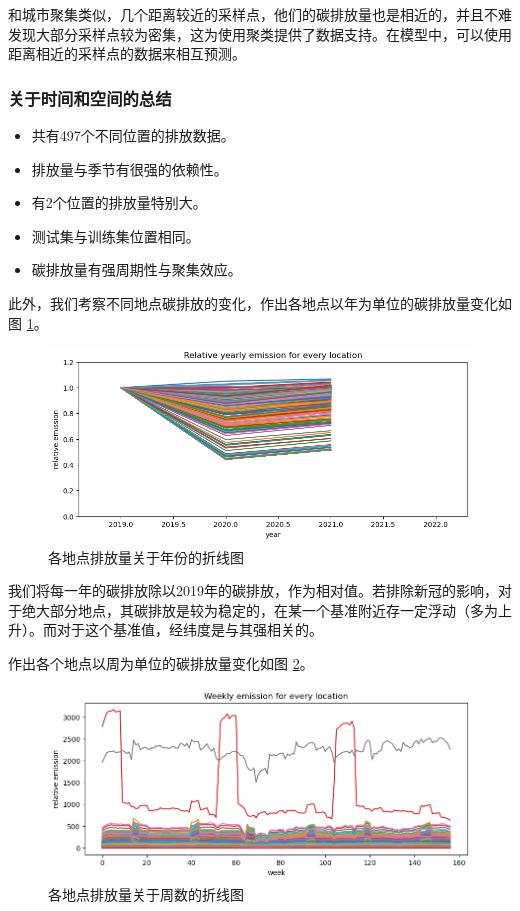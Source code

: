 \documentclass{ctexart}
\begin{document}
和城市聚集类似，几个距离较近的采样点，他们的碳排放量也是相近的，并且不难发现大部分采样点较为密集，这为使用聚类提供了数据支持。在模型中，可以使用距离相近的采样点的数据来相互预测。

\subsubsection{关于时间和空间的总结}

\begin{itemize}
      \item 共有497个不同位置的排放数据。
      \item 排放量与季节有很强的依赖性。
      \item 有2个位置的排放量特别大。
      \item 测试集与训练集位置相同。
      \item 碳排放量有强周期性与聚集效应。
\end{itemize}

此外，我们考察不同地点碳排放的变化，作出各地点以年为单位的碳排放量变化如图 \ref{fig:5}。

\begin{figure}[H]
      \centering
      \includegraphics[width=1\textwidth]{output5.png}
      \caption{各地点排放量关于年份的折线图}
      \label{fig:5}
\end{figure}

我们将每一年的碳排放除以2019年的碳排放，作为相对值。若排除新冠的影响，对于绝大部分地点，其碳排放是较为稳定的，在某一个基准附近存一定浮动（多为上升）。而对于这个基准值，经纬度是与其强相关的。

作出各个地点以周为单位的碳排放量变化如图 \ref{fig:8}。

\begin{figure}[H]
      \centering
      \includegraphics[width=1\textwidth]{output8.png}
      \caption{各地点排放量关于周数的折线图}
      \label{fig:8}
\end{figure}
\end{document}
